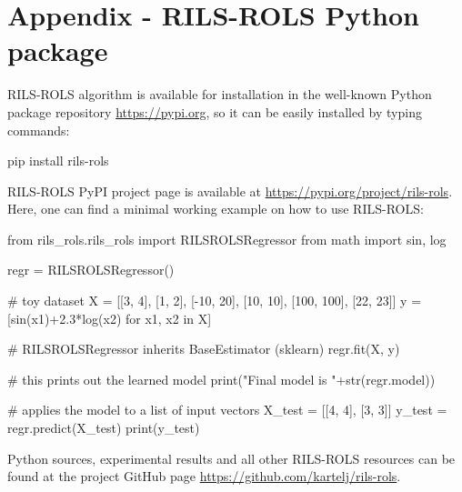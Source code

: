 \documentclass{bmcart}
\begin{document}
\section*{Appendix - \textsc{RILS}-\textsc{ROLS} Python package}\label{sec:appendix-1}

\textsc{RILS-ROLS} algorithm is available for installation in the well-known Python package repository \url{https://pypi.org}, so it can be easily installed by typing commands:
\begin{python} 
	pip install rils-rols
\end{python}
\textsc{RILS-ROLS} PyPI project page is available at \url{https://pypi.org/project/rils-rols}. Here, one can find a minimal working example on how to use \textsc{RILS-ROLS}:

\begin{python}
	from rils_rols.rils_rols import RILSROLSRegressor
	from math import sin, log
	
	regr = RILSROLSRegressor()
	
	# toy dataset 
	X = [[3, 4], [1, 2], [-10, 20], [10, 10], [100, 100], [22, 23]]
	y = [sin(x1)+2.3*log(x2) for x1, x2 in X]
	
	# RILSROLSRegressor inherits BaseEstimator (sklearn)
	regr.fit(X, y)
	
	# this prints out the learned model
	print("Final model is "+str(regr.model))
	
	# applies the model to a list of input vectors
	X_test = [[4, 4], [3, 3]]
	y_test = regr.predict(X_test)
	print(y_test) 
\end{python}

Python sources, experimental results and all other \textsc{RILS-ROLS} resources can be found at the project GitHub page \url{https://github.com/kartelj/rils-rols}. 
 

\end{document}
